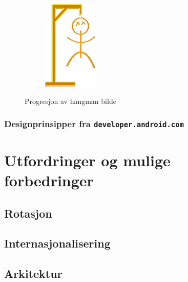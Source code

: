 \begin{figure}[ht]
\begin{subfigure}[b]{0.1\textwidth}
        \includegraphics[width=\textwidth]{./img/gui/hang6.png}
    \end{subfigure}
    \caption{Progresjon av hangman bilde}
    \label{fig:hangman_progresjon}
\end{figure}

\subsection{Designprinsipper fra \texttt{developer.android.com}}


\chapter{Utfordringer og mulige forbedringer}
\section{Rotasjon}
\section{Internasjonalisering}
\section{Arkitektur}



